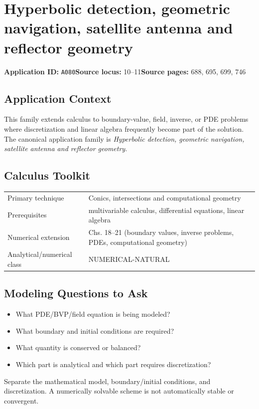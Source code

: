 \documentclass[11pt]{book}
\newcommand{\pid}[1]{\texttt{#1}}
\begin{document}
\chapter{Hyperbolic detection, geometric navigation, satellite antenna and reflector geometry}\label{app:A080}
\textbf{Application ID:} \pid{A080}\quad \textbf{Source locus:} 10–11\quad \textbf{Source pages:} 688, 695, 699, 746
\section*{Application Context}
This family extends calculus to boundary-value, field, inverse, or PDE problems where discretization and linear algebra frequently become part of the solution. The canonical application family is \emph{Hyperbolic detection, geometric navigation, satellite antenna and reflector geometry}.
\section*{Calculus Toolkit}
\begin{tabularx}{\textwidth}{@{}lX@{}}\toprule
Primary technique & Conics, intersections and computational geometry \\
Prerequisites & multivariable calculus, differential equations, linear algebra \\
Numerical extension & Chs. 18–21 (boundary values, inverse problems, PDEs, computational geometry) \\
Analytical/numerical class & NUMERICAL-NATURAL \\
\bottomrule\end{tabularx}
\section*{Modeling Questions to Ask}\begin{itemize}
\item What PDE/BVP/field equation is being modeled?
\item What boundary and initial conditions are required?
\item What quantity is conserved or balanced?
\item Which part is analytical and which part requires discretization?
\end{itemize}
\begin{errorbox}Separate the mathematical model, boundary/initial conditions, and discretization. A numerically solvable scheme is not automatically stable or convergent.\end{errorbox}
\end{document}
